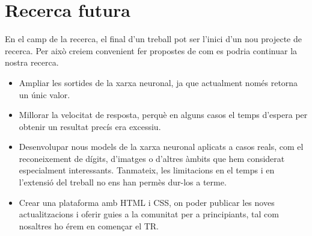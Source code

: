 \section{Recerca futura}
En el camp de la recerca, el final d'un treball pot ser l'inici d'un nou projecte de recerca. Per això creiem convenient fer propostes de com es podria continuar la nostra recerca.


\begin{itemize}

\item Ampliar les sortides de la xarxa neuronal, ja que actualment només retorna un únic valor.

\item Millorar la velocitat de resposta, perquè en alguns casos el temps d’espera per obtenir un resultat precís era excessiu.

\item Desenvolupar nous models de la xarxa neuronal aplicats a casos reals, com el reconeixement de dígits, d’imatges o d’altres àmbits que hem considerat especialment interessants. Tanmateix, les limitacions en el temps i en l’extensió del treball no ens han permès dur-los a terme.

\item Crear una plataforma amb HTML\cite{HTML} i CSS\cite{CSS}, on poder publicar les noves actualitzacions i oferir guies a la comunitat per a principiants, tal com nosaltres ho érem en començar el TR.

\end{itemize}

